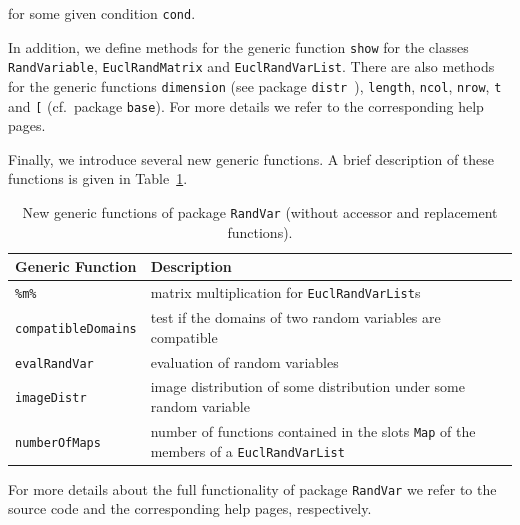 \documentclass[11pt]{article}
\begin{document}
for some given condition {\tt cond}.
\par
In addition, we define methods for the generic function {\tt show} for the classes
{\tt RandVariable}, {\tt EuclRandMatrix} and {\tt EuclRandVarList}. There are 
also methods for the generic functions {\tt dimension} (see package 
{\tt distr}~\cite{distr}), {\tt length}, {\tt ncol}, {\tt nrow}, {\tt t} and 
{\tt [} (cf.\ package {\tt base}). For more details we refer to the corresponding 
help pages.
\par
Finally, we introduce several new generic functions. A brief description
of these functions is given in Table~\ref{ap.Rpack.RandVar.tab}.
\begin{table}[!ht]
\begin{center}
\begin{tabular}{p{3.5cm}|p{8cm}}
  \textbf{Generic Function} & \textbf{Description} \\ \hline\hline
  \texttt{\%m\%} & matrix multiplication for {\tt EuclRandVarList}s \\ \hline
  \texttt{compatibleDomains} & test if the domains of two random variables
                     are compatible \\ \hline
  \texttt{evalRandVar} & evaluation of random variables\\ \hline
  \texttt{imageDistr} & image distribution of some distribution under some
               random variable \\ \hline
  \texttt{numberOfMaps} & number of functions contained in the slots {\tt Map}
                 of the members of a {\tt EuclRandVarList}
\end{tabular}
\caption[New Generic Functions of Package {\tt RandVar}]
{New generic functions of package {\tt RandVar} (without accessor
and replacement functions).}\label{ap.Rpack.RandVar.tab}%
\end{center}
\end{table}
\par\noindent
For more details about the full functionality of package {\tt RandVar}
we refer to the source code and the corresponding help pages, respectively.
\end{document}
